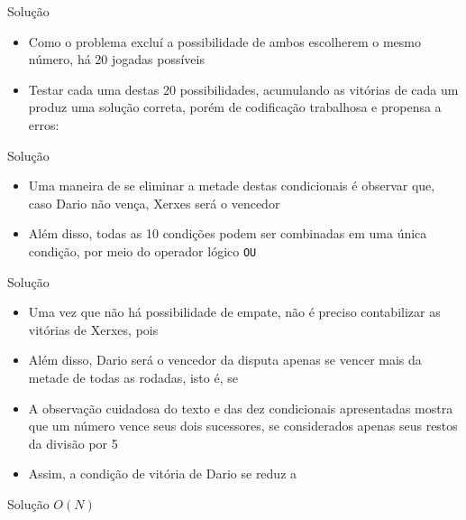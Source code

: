 \begin{frame}[fragile]{Solução}

    \begin{itemize}
        \item Como o problema excluí a possibilidade de ambos escolherem o mesmo número,
            há 20 jogadas possíveis

        \item Testar cada uma destas 20 possibilidades, acumulando as vitórias de cada um
            produz uma solução correta, porém de codificação trabalhosa e propensa a erros:

        \vspace{0.1in}

    \end{itemize}

\end{frame}

\begin{frame}[fragile]{Solução}

    \begin{itemize}
        \item Uma maneira de se eliminar a metade destas condicionais é observar que, caso Dario
            não vença, Xerxes será o vencedor

        \item Além disso, todas as 10 condições podem ser combinadas em uma única condição, por
            meio do operador lógico \texttt{OU}

        \vspace{0.1in}

    \end{itemize}

\end{frame}

\begin{frame}[fragile]{Solução}

    \begin{itemize}
        \item Uma vez que não há possibilidade de empate, não é preciso contabilizar as vitórias
            de Xerxes, pois 

        \item Além disso, Dario será o vencedor da disputa apenas se vencer mais da metade de todas
            as rodadas, isto é, se 

        \item A observação cuidadosa do texto e das dez condicionais apresentadas mostra que um
            número  vence seus dois sucessores, se considerados apenas seus restos
            da divisão por 5

        \item Assim, a condição de vitória de Dario se reduz a

        \vspace{0.1in}

    \end{itemize}

\end{frame}

\begin{frame}[fragile]{Solução $O(N)$}
\end{frame}

